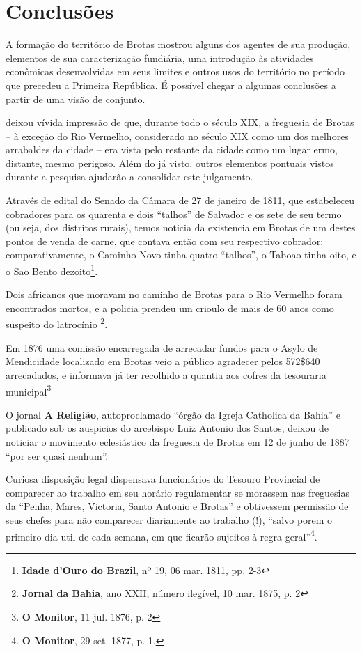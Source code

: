 \section{Conclusões}

A formação do território de Brotas mostrou alguns dos agentes de sua produção, elementos de sua caracterização fundiária, uma introdução às atividades econômicas desenvolvidas em seus limites e outros usos do território no período que precedeu a Primeira República. É possível chegar a algumas conclusões a partir de uma visão de conjunto.



deixou vívida impressão de que, durante todo o século XIX, a freguesia de Brotas -- à exceção do Rio Vermelho, considerado no século XIX como um dos melhores arrabaldes da cidade -- era vista pelo restante da cidade como um lugar ermo, distante, mesmo perigoso. Além do já visto, outros elementos pontuais vistos durante a pesquisa ajudarão a consolidar este julgamento.

Através de edital do Senado da Câmara de 27 de janeiro de 1811, que estabeleceu cobradores para os quarenta e dois ``talhos'' de Salvador e os sete de seu termo (ou seja, dos distritos rurais), temos noticia da existencia em Brotas de um destes pontos de venda de carne, que contava então com seu respectivo cobrador; comparativamente, o Caminho Novo tinha quatro ``talhos'', o Taboao tinha oito, e o Sao Bento dezoito\footnote{\textbf{Idade d'Ouro do Brazil}, nº 19, 06 mar. 1811, pp. 2-3}.

Dois africanos que moravam no caminho de Brotas para o Rio Vermelho foram encontrados mortos, e a policia prendeu um crioulo de mais de 60 anos como suspeito do latrocínio \footnote{\textbf{Jornal da Bahia}, ano XXII, número ilegível, 10 mar. 1875, p. 2}.

Em 1876 uma comissão encarregada de arrecadar fundos para o Asylo de Mendicidade localizado em Brotas veio a público agradecer pelos 572\$640 arrecadados, e informava já ter recolhido a quantia aos cofres da tesouraria municipal\footnote{\textbf{O Monitor}, 11 jul. 1876, p. 2}

O jornal \textbf{A Religião}, autoproclamado ``órgão da Igreja Catholica da Bahia'' e publicado sob os auspicios do arcebispo Luiz Antonio dos Santos, deixou de noticiar o movimento eclesiástico da freguesia de Brotas em 12 de junho de 1887 ``por ser quasi nenhum''.

Curiosa disposição legal dispensava funcionários do Tesouro Provincial de comparecer ao trabalho em seu horário regulamentar se morassem nas freguesias da ``Penha, Mares, Victoria, Santo Antonio e Brotas'' e obtivessem permissão de seus chefes para não comparecer diariamente ao trabalho (!), ``salvo porem o primeiro dia util de cada semana, em que ficarão sujeitos à regra geral''\footnote{\textbf{O Monitor}, 29 set. 1877, p. 1.}.

